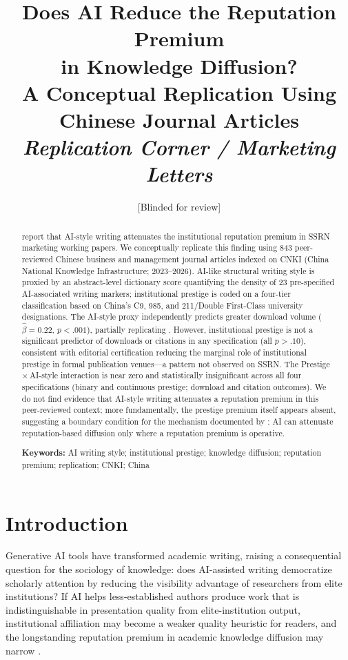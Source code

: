 \documentclass[12pt,a4paper]{article}
\title{\textbf{Does AI Reduce the Reputation Premium\\
in Knowledge Diffusion?\\
A Conceptual Replication Using Chinese Journal Articles}\\[0.8em]
\large\textit{Replication Corner / Marketing Letters}}
\author{[Blinded for review]}
\date{}
\begin{document}
\maketitle

\begin{abstract}
\noindent
\citet{JoLi2026} report that AI-style writing attenuates the
institutional reputation premium in SSRN marketing working papers.
We conceptually replicate this finding using 843 peer-reviewed Chinese
business and management journal articles indexed on CNKI
(China National Knowledge Infrastructure; 2023--2026).
AI-like structural writing style is proxied by an abstract-level
dictionary score quantifying the density of 23 pre-specified
AI-associated writing markers; institutional prestige is coded on a
four-tier classification based on China's C9, 985, and
211/Double First-Class university designations.
The AI-style proxy independently predicts greater download volume
($\hat{\beta}=0.22$, $p<.001$), partially replicating \citet{JoLi2026}.
However, institutional prestige is not a significant predictor of
downloads or citations in any specification (all $p>.10$), consistent
with editorial certification reducing the marginal role of institutional
prestige in formal publication venues---a pattern not observed on SSRN.
The Prestige\,$\times$\,AI-style interaction is near zero and
statistically insignificant across all four specifications (binary and
continuous prestige; download and citation outcomes).
We do not find evidence that AI-style writing attenuates a reputation
premium in this peer-reviewed context; more fundamentally, the prestige
premium itself appears absent, suggesting a boundary condition for the
mechanism documented by \citet{JoLi2026}: AI can attenuate
reputation-based diffusion only where a reputation premium is operative.

\smallskip\noindent
\textbf{Keywords:} AI writing style; institutional prestige; knowledge
diffusion; reputation premium; replication; CNKI; China
\end{abstract}

\newpage

\section{Introduction}
\label{sec:intro}

Generative AI tools have transformed academic writing, raising a
consequential question for the sociology of knowledge: does AI-assisted
writing democratize scholarly attention by reducing the visibility
advantage of researchers from elite institutions?
If AI helps less-established authors produce work that is
indistinguishable in presentation quality from elite-institution output,
institutional affiliation may become a weaker quality heuristic for
readers, and the longstanding reputation premium in academic knowledge
diffusion may narrow
\citep{Merton1968,Spence1973,DiMaggio1983}.
\end{document}

